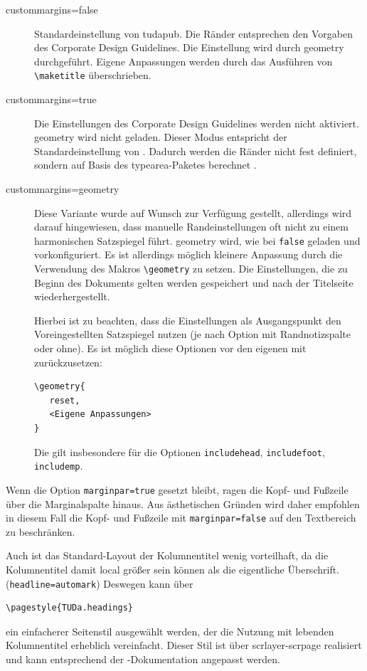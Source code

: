 \documentclass[
	ngerman,%
	accentcolor=9c,%
	ruledheaders=chapter,%
	class=book,%
	thesis={%
		type=dr,
		dr=rernat
	},
	fontsize=11pt,%
	parskip=half-,%
	custommargins=true,%
	marginpar=false,%
]{tudapub}
\newcommand*{\code}[1]{\texttt{#1}}
\newcommand*{\pkg}[1]{\textsf{#1}}
\newcommand*{\cls}[1]{\textsf{#1}}
\begin{document}
\begin{description}
	\item[custommargins=false] Standardeinstellung von \cls{tudapub}. Die Ränder entsprechen den Vorgaben des Corporate Design Guidelines. Die Einstellung wird durch \pkg{geometry} durchgeführt. Eigene Anpassungen werden durch das Ausführen von \code{\textbackslash{}maketitle} überschrieben.
	\item[custommargins=true] Die Einstellungen des Corporate Design Guidelines werden nicht aktiviert. \pkg{geometry} wird nicht geladen. Dieser Modus entspricht der Standardeinstellung von \KOMAScript{}. Dadurch werden die Ränder nicht fest definiert, sondern auf Basis des \pkg{typearea}-Paketes berechnet \cite[vgl.][]{scrguide}.
	\item[custommargins=geometry]  Diese Variante wurde auf Wunsch zur Verfügung gestellt, allerdings wird darauf hingewiesen, dass manuelle Randeinstellungen oft nicht zu einem harmonischen Satzspiegel führt.
	      \pkg{geometry} wird, wie bei \code{false} geladen und vorkonfiguriert. Es ist allerdings möglich kleinere Anpassung durch die Verwendung des Makros \code{\textbackslash{}geometry} zu setzen. Die Einstellungen, die zu Beginn des Dokuments gelten werden gespeichert und nach der Titelseite wiederhergestellt.

	      Hierbei ist zu beachten, dass die Einstellungen als Ausgangspunkt den Voreingestellten Satzspiegel nutzen (je nach Option mit Randnotizspalte oder ohne). Es ist möglich diese Optionen vor den eigenen mit zurückzusetzen:
\begin{verbatim}
\geometry{
   reset,
   <Eigene Anpassungen>
}
\end{verbatim}
	      Die gilt insbesondere für die Optionen \code{includehead}, \code{includefoot}, \code{includemp}.
\end{description}

Wenn die Option \code{marginpar=true} gesetzt bleibt, ragen die Kopf- und Fußzeile über die Marginalspalte hinaus. Aus ästhetischen Gründen wird daher empfohlen in diesem Fall die Kopf- und Fußzeile  mit \code{marginpar=false}  auf den Textbereich zu beschränken.

Auch ist das Standard-Layout der Kolumnentitel wenig vorteilhaft, da die Kolumnentitel damit local größer sein können als die eigentliche Überschrift. (\code{headline=automark})
Deswegen kann über
\begin{verbatim}
\pagestyle{TUDa.headings}
\end{verbatim}
ein einfacherer Seitenstil ausgewählt werden, der die Nutzung mit lebenden Kolumnentitel erheblich vereinfacht. Dieser Stil ist über \pkg{scrlayer-scrpage} realisiert und kann entsprechend der \KOMAScript{}-Dokumentation angepasst werden.
\end{document}
